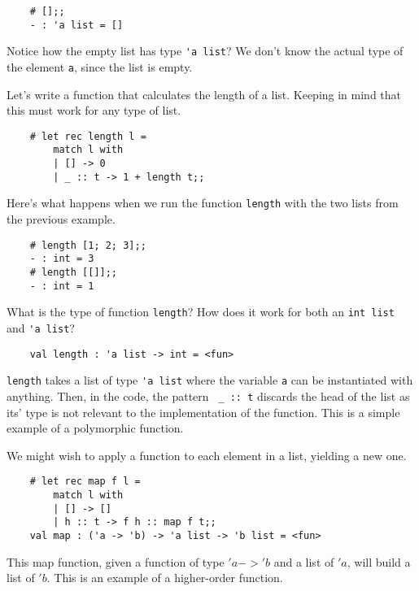 \begin{lstlisting}
    # [];;
    - : 'a list = []
\end{lstlisting}
Notice how the empty list has type \lstinline{'a list}? We don't know the actual type of the element \lstinline{a}, since the list is empty.

Let's write a function that calculates the length of a list. Keeping in mind that this must work for any type of list. 

\begin{lstlisting}
    # let rec length l =
        match l with
        | [] -> 0
        | _ :: t -> 1 + length t;;
\end{lstlisting}

Here's what happens when we run the function \lstinline{length} with the two lists from the previous example.

\begin{lstlisting}
    # length [1; 2; 3];;
    - : int = 3
    # length [[]];;
    - : int = 1
\end{lstlisting}

What is the type of function \lstinline{length}? How does it work for both an \lstinline{int list} and \lstinline{'a list}?

\begin{lstlisting}
    val length : 'a list -> int = <fun>
\end{lstlisting}

\lstinline{length} takes a list of type \lstinline{'a list} where the variable \lstinline{a} can be instantiated with anything. Then, in the code, the pattern \lstinline{ _ :: t} discards the head of the list as its' type is not relevant to the implementation of the function. This is a simple example of a polymorphic function.

We might wish to apply a function to each element in a list, yielding a new one.

\begin{lstlisting}
    # let rec map f l =
        match l with
        | [] -> []
        | h :: t -> f h :: map f t;;
    val map : ('a -> 'b) -> 'a list -> 'b list = <fun>
\end{lstlisting}

This map function, given a function of type $'a -> 'b$ and a list of $'a$, will build a list of $'b$. This is an example of a higher-order function. 


